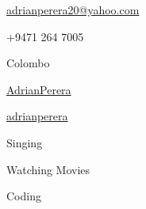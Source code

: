 \documentclass[11pt]{spidercv}
\begin{document}
    \begin{TopBar}{\ColorTextSide}

        \begin{DoubleColumns}
            \begin{ItemList}{\ColorHighlight}
                \item [\Large\faAt] \href{mailto:adrianperera20@yahoo.com}{adrianperera20@yahoo.com}
                \item [\Large\faMobile] +9471 264 7005
                \item [\Large\faMapMarker] Colombo
            \end{ItemList}
            \nextcolumn
            \begin{ItemList}{\ColorHighlight}
                \item [\Large\faGithub] \href{https://github.com/AdrianPerera}{AdrianPerera}
                \item [\Large\faLinkedinSquare] \href{https://www.linkedin.com/in/adrianperera/}{adrianperera}
            \end{ItemList}
        \end{DoubleColumns}

        \begin{TripleColumns}
            \begin{ItemList}{\ColorHighlight}
                \item [] Singing
            \end{ItemList}
            \nextcolumn
            \begin{ItemList}{\ColorHighlight}
                \item [] Watching Movies
            \end{ItemList}
            \nextcolumn
            \begin{ItemList}{\ColorHighlight}
                \item [] Coding
            \end{ItemList}
        \end{TripleColumns}
    \end{TopBar}
\end{document}
